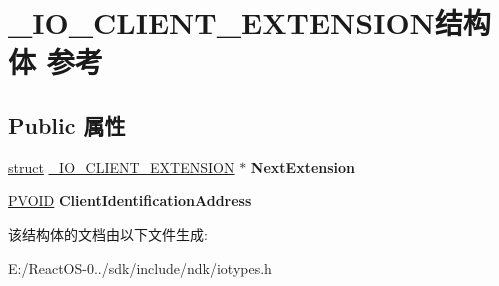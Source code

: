 \hypertarget{struct___i_o___c_l_i_e_n_t___e_x_t_e_n_s_i_o_n}{}\section{\+\_\+\+I\+O\+\_\+\+C\+L\+I\+E\+N\+T\+\_\+\+E\+X\+T\+E\+N\+S\+I\+O\+N结构体 参考}
\label{struct___i_o___c_l_i_e_n_t___e_x_t_e_n_s_i_o_n}
\subsection*{Public 属性}
\begin{DoxyCompactItemize}
\item 
\mbox{\label{struct___i_o___c_l_i_e_n_t___e_x_t_e_n_s_i_o_n_a4b4c96c8a54b91c818d12d37ed14a2a1}} 
\hyperlink{interfacestruct}{struct} \hyperlink{struct___i_o___c_l_i_e_n_t___e_x_t_e_n_s_i_o_n}{\+\_\+\+I\+O\+\_\+\+C\+L\+I\+E\+N\+T\+\_\+\+E\+X\+T\+E\+N\+S\+I\+ON} $\ast$ {\bfseries Next\+Extension}
\item 
\mbox{\label{struct___i_o___c_l_i_e_n_t___e_x_t_e_n_s_i_o_n_a3a29cb0edd5eb30a5acf908aafbe77ea}} 
\hyperlink{interfacevoid}{P\+V\+O\+ID} {\bfseries Client\+Identification\+Address}
\end{DoxyCompactItemize}


该结构体的文档由以下文件生成\+:\begin{DoxyCompactItemize}
\item 
E\+:/\+React\+O\+S-\/0../sdk/include/ndk/iotypes.\+h\end{DoxyCompactItemize}
